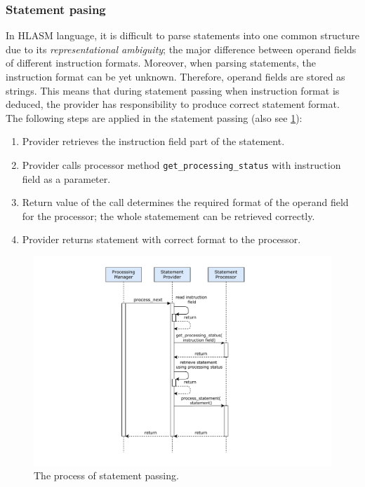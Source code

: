 \subsubsection{Statement pasing}
\label{lab06:proc_stat}

In HLASM language, it is difficult to parse statements into one common structure due to its \emph{representational ambiguity}; the major difference between operand fields of different instruction formats. Moreover, when parsing statements, the instruction format can be yet unknown. Therefore, operand fields are stored as strings. This means that during statement passing when instruction format is deduced, the provider has responsibility to produce correct statement format. The following steps are applied in the statement passing (also see \cref{fig06:process_next}):

\begin{enumerate}
	\item Provider retrieves the instruction field part of the statement.
	\item Provider calls processor method \texttt{get\_processing\_status} with instruction field as a parameter.
	\item Return value of the call determines the required format of the operand field for the processor; the whole statemement can be retrieved correctly.
	\item Provider returns statement with correct format to the processor. 
\end{enumerate}

\begin{figure}
	\centering
	\includegraphics[width=13cm]{img/process_next}
	\caption{The process of statement passing.}
	\label{fig06:process_next}
\end{figure}


